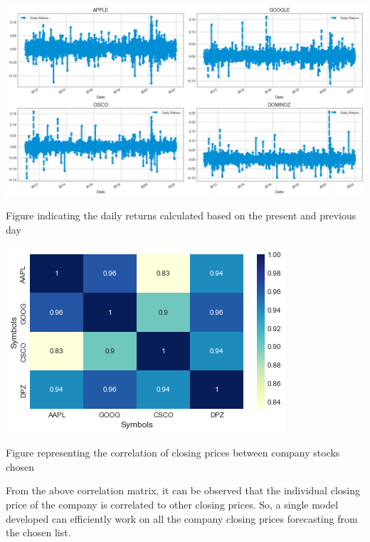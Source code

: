 \begin{center}
    \includegraphics[scale=0.40]{daily_returns.png}
    \caption{ Figure indicating the daily returns calculated based on the present and previous day}
\end{center}

\begin{center}
    \includegraphics[scale=0.80]{heatmap.png}
    \caption{ Figure representing the correlation of closing prices between company stocks chosen}
\end{center}
\newpage
From the above correlation matrix, it can be observed that the individual closing price of the company is correlated to other closing prices. So, a single model developed can efficiently work on all the company closing prices forecasting from the chosen list.

